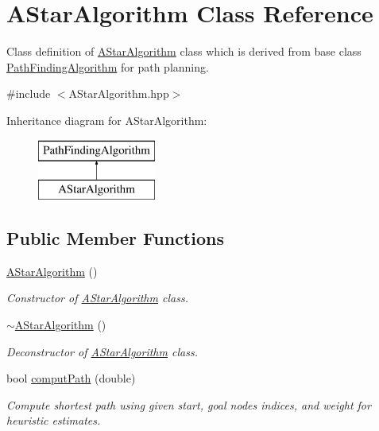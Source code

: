 \hypertarget{classAStarAlgorithm}{\section{A\-Star\-Algorithm Class Reference}
\label{classAStarAlgorithm}
}


Class definition of \hyperlink{classAStarAlgorithm}{A\-Star\-Algorithm} class which is derived from base class \hyperlink{classPathFindingAlgorithm}{Path\-Finding\-Algorithm} for path planning.  




{\ttfamily \#include $<$A\-Star\-Algorithm.\-hpp$>$}

Inheritance diagram for A\-Star\-Algorithm\-:\begin{figure}[H]
\begin{center}
\leavevmode
\includegraphics[height=2.000000cm]{d5/d12/classAStarAlgorithm}
\end{center}
\end{figure}
\subsection*{Public Member Functions}
\begin{DoxyCompactItemize}
\item 
\hyperlink{classAStarAlgorithm_afa80dc5f04400d38c43a609da0ce948e}{A\-Star\-Algorithm} ()
\begin{DoxyCompactList}\small\item\em Constructor of \hyperlink{classAStarAlgorithm}{A\-Star\-Algorithm} class. \end{DoxyCompactList}\item 
\hyperlink{classAStarAlgorithm_a2ab75ee9abadf5919c22fe1ee812b8d4}{$\sim$\-A\-Star\-Algorithm} ()
\begin{DoxyCompactList}\small\item\em Deconstructor of \hyperlink{classAStarAlgorithm}{A\-Star\-Algorithm} class. \end{DoxyCompactList}\item 
bool \hyperlink{classAStarAlgorithm_af3adf65228c56523489d3bd4e278e66f}{comput\-Path} (double)
\begin{DoxyCompactList}\small\item\em Compute shortest path using given start, goal nodes indices, and weight for heuristic estimates. \end{DoxyCompactList}\end{DoxyCompactItemize}
